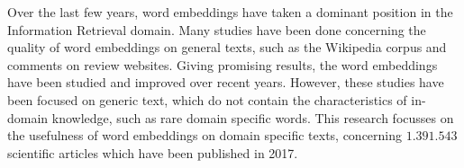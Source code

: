 \documentclass[../../Thesis.tex]{subfiles}
\begin{document}
Over the last few years, word embeddings have taken a dominant position in the Information Retrieval domain. Many studies have been done concerning the quality of word embeddings on general texts, such as the Wikipedia corpus and comments on review websites. Giving promising results, the word embeddings have been studied and improved over recent years. However, these studies have been focused on generic text, which do not contain the characteristics of in-domain knowledge, such as rare domain specific words. This research focusses on the usefulness of word embeddings on domain specific texts, concerning $1.391.543$ scientific articles which have been published in 2017.
\end{document}
